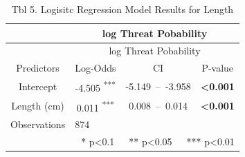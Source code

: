 \documentclass[
  letterpaper,
  DIV=11,
  numbers=noendperiod]{scrartcl}
\begin{document}
\begin{longtable}[]{@{}cccc@{}}
\caption{Tbl 5. Logisitc Regression Model Results for
Length}\tabularnewline
\toprule()
~ & \multicolumn{3}{c}{log Threat Pobability} \\
\midrule()
\endfirsthead
\toprule()
~ & \multicolumn{3}{c}{log Threat Pobability} \\
\midrule()
\endhead
Predictors & Log-Odds & CI & P-value \\
Intercept & -4.505 \textsuperscript{***} & -5.149~--~-3.958 &
\textbf{\textless0.001} \\
Length (cm) & 0.011 \textsuperscript{***} & 0.008~--~0.014 &
\textbf{\textless0.001} \\
Observations & \multicolumn{3}{l}{874} \\
\multicolumn{4}{r}{* p\textless0.1~~~** p\textless0.05~~~***
p\textless0.01} \\
\bottomrule()
\end{longtable}
\end{document}
